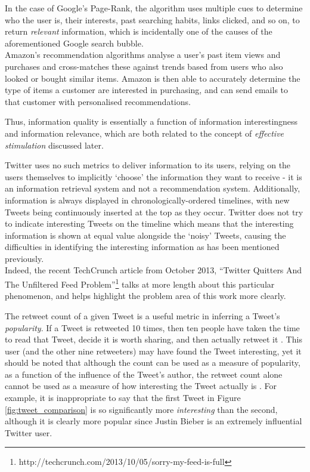 In the case of Google's Page-Rank, the algorithm uses multiple cues to determine who the user is, their interests, past searching habits, links clicked, and so on, to return \textit{relevant} information, which is incidentally one of the causes of the aforementioned Google search bubble.\\
Amazon's recommendation algorithms analyse a user's past item views and purchases and cross-matches these against trends based from users who also looked or bought similar items. Amazon is then able to accurately determine the type of items a customer are interested in purchasing, and can send emails to that customer with personalised recommendations.

Thus, information quality is essentially a function of information interestingness and information relevance, which are both related to the concept of \textit{effective stimulation} \cite{xu07} discussed later.

Twitter uses no such metrics to deliver information to its users, relying on the users themselves to implicitly `choose' the information they want to receive - it is an information retrieval system and not a recommendation system. Additionally, information is always displayed in chronologically-ordered timelines, with new Tweets being continuously inserted at the top as they occur. Twitter does not try to indicate interesting Tweets on the timeline which means that the interesting information is shown at equal value alongside the `noisy' Tweets, causing the difficulties in identifying the interesting information as has been mentioned previously.\\
Indeed, the recent TechCrunch article from October 2013, ``Twitter Quitters And The Unfiltered Feed Problem''\footnote{http://techcrunch.com/2013/10/05/sorry-my-feed-is-full} talks at more length about this particular phenomenon, and helps highlight the problem area of this work more clearly.

The retweet count of a given Tweet is a useful metric in inferring a Tweet's \textit{popularity}. If a Tweet is retweeted 10 times, then ten people have taken the time to read that Tweet, decide it is worth sharing, and then actually retweet it \cite{uysal11}. This user (and the other nine retweeters) may have found the Tweet interesting, yet it should be noted that although the count can be used as a measure of popularity, as a function of the influence of the Tweet's author, the retweet count alone cannot be used as a measure of how interesting the Tweet actually is \cite{naveed11}. For example, it is inappropriate to say that the first Tweet in Figure \ref{fig:tweet_comparison} is so significantly more \textit{interesting} than the second, although it is clearly more popular since Justin Bieber is an extremely influential Twitter user.


